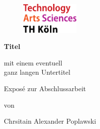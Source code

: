 \begin{titlepage}

\begin{center}

\begin{figure}[!ht]
		\includegraphics[width=0.26\textwidth]{images/THlogoheader.pdf}
\end{figure}

\vspace{0.8cm}

\begin{rmfamily}
\begin{huge}
\textbf{Titel}\\
\end{huge}
\vspace{0.5cm}
\begin{LARGE}
mit einem eventuell\\ganz langen Untertitel\\
\end{LARGE}
\end{rmfamily}

\vspace{1.6cm}



\begin{LARGE}
\begin{scshape}
Exposé zur Abschlussarbeit\\[0.8em]
\end{scshape}
\end{LARGE}

\begin{large}
von\\
\vspace{0.2cm}
\begin{LARGE}
Chrsitain Alexander Poplawski\\
\end{LARGE}
\end{large}


\end{center}
\end{titlepage}
